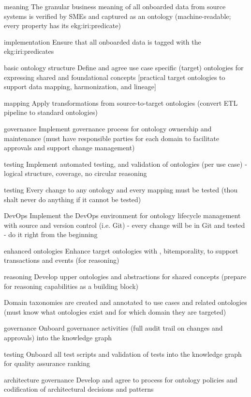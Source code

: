 \begin{scoring}

  \item [meaning] The granular business meaning of all onboarded data from source systems is verified by SMEs and
        captured as an ontology (machine-readable; every property has its \gls{ekg:iri:predicate})
  \item [implementation] Ensure that all onboarded data is tagged with the \glspl{ekg:iri:predicate}
  \item [basic ontology structure] Define and agree use case specific (target) ontologies for expressing shared and
        foundational concepts [practical target ontologies to support data mapping, harmonization, and lineage]
  \item [mapping] Apply transformations from source-to-target ontologies (convert ETL pipeline to standard ontologies)
  \item [governance] Implement governance process for ontology ownership and maintenance (must have responsible parties
        for each domain to facilitate approvals and support change management)
  \item [testing] Implement automated testing, and validation of ontologies (per use case) - logical structure, coverage,
        no circular reasoning
  \item [testing] Every change to any ontology and every mapping must be tested (thou shalt never do anything if it
        cannot be tested)
  \item [DevOps] Implement the DevOps environment for ontology lifecycle management with source and version control
        (i.e. Git) - every change will be in Git and tested - do it right from the beginning

\end{scoring}

\ekgmmscoringlevelTwo

\begin{scoring}

  \item [enhanced ontologies] Enhance target ontologies with , \gls{bitemporality}, to support
        transactions and events (for reasoning)
  \item [reasoning] Develop upper ontologies and abstractions for shared concepts (prepare for reasoning capabilities
        as a building block)
  \item Domain taxonomies are created and annotated to use cases and related ontologies (must know what ontologies
        exist and for which domain they are targeted)
  \item [governance] Onboard governance activities (full audit trail on changes and approvals) into the knowledge graph
  \item [testing] Onboard all test scripts and validation of tests into the knowledge graph for quality assurance ranking
  \item [architecture governance] Develop and agree to process for ontology policies and codification of architectural
        decisions and patterns

\end{scoring}


